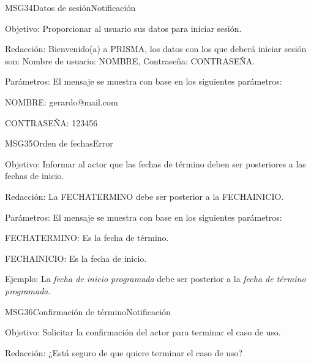 \begin{mensaje}{MSG34}{Datos de sesión}{Notificación}
    \item[Objetivo:] Proporcionar al usuario sus datos para iniciar sesión.
    \item[Redacción:] Bienvenido(a) a PRISMA, los datos con los que deberá iniciar sesión son: Nombre de usuario: NOMBRE, Contraseña: CONTRASEÑA.
    \item[Parámetros:] El mensaje se muestra con base en los siguientes parámetros:
    \begin{Citemize}
	\item NOMBRE: gerardo@mail.com
	\item CONTRASEÑA: 123456
    \end{Citemize}
\end{mensaje}

\begin{mensaje}{MSG35}{Orden de fechas}{Error}
    \item[Objetivo:] Informar al actor que las fechas de término deben ser posteriores a las fechas de inicio.
    \item[Redacción:] La FECHATERMINO debe ser posterior a la FECHAINICIO.
    \item[Parámetros:] El mensaje se muestra con base en los siguientes parámetros:
    \begin{Citemize}
	\item FECHATERMINO: Es la fecha de término.
	\item FECHAINICIO: Es la fecha de inicio.
    \end{Citemize}
    \item[Ejemplo:] La {\em fecha de inicio programada} debe ser posterior a la {\em fecha de término programada}.
\end{mensaje}

\begin{mensaje}{MSG36}{Confirmación de término}{Notificación}
    \item[Objetivo:] Solicitar la confirmación del actor para terminar el caso de uso.
    \item[Redacción:] ¿Está seguro de que quiere terminar el caso de uso?
\end{mensaje}
